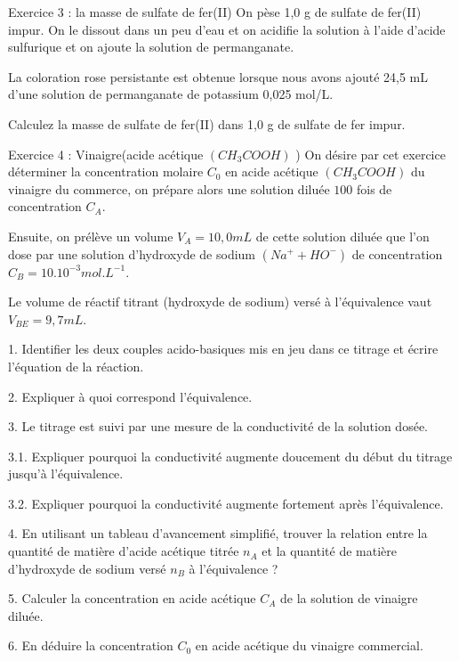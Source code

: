 \documentclass[12pt, french]{article}
\begin{document}
\begin{Box2}{Exercice 3 : la masse de sulfate de fer(II)}
On pèse 1,0 g de sulfate de fer(II) impur. On le dissout dans un peu d'eau et on acidifie la solution à l'aide
d'acide sulfurique et on ajoute la solution de permanganate. 

   La coloration rose persistante est obtenue
lorsque nous avons ajouté 24,5 mL d'une solution de permanganate de potassium 0,025 mol/L.

   Calculez la masse de sulfate de fer(II) dans 1,0 g de sulfate de fer impur.
\end{Box2}


\begin{Box2}{Exercice 4 :  Vinaigre(acide acétique $(CH_3COOH)$ ) }
On désire par cet exercice déterminer la concentration molaire $C_0$ en acide acétique $(CH_3COOH)$ du vinaigre du commerce, on prépare alors une solution diluée $100$ fois de concentration $C_A$.

Ensuite, on prélève un volume $V_A = 10,0 mL$ de cette solution diluée que l'on dose par une solution d'hydroxyde de
sodium $(Na^+ + HO^-)$ de concentration $C_B = 10.10^{-3} mol.L^{-1}$.

   Le volume de réactif titrant (hydroxyde de sodium) versé à l'équivalence vaut $V_{BE} = 9,7 mL.$

1. Identifier les deux couples acido-basiques mis en jeu dans ce titrage et écrire l'équation de la réaction.

2. Expliquer à quoi correspond l'équivalence.

3. Le titrage est suivi par une mesure de la conductivité de la solution dosée.

3.1. Expliquer pourquoi la conductivité augmente doucement du début du titrage jusqu'à l'équivalence.

3.2. Expliquer pourquoi la conductivité augmente fortement après l'équivalence.

   4. En utilisant un tableau d’avancement simplifié, trouver la relation entre la quantité de matière d'acide
acétique titrée $n_A$ et la quantité de matière d'hydroxyde de sodium versé $n_B$ à l'équivalence ?

5. Calculer la concentration en acide acétique $C_A$ de la solution de vinaigre diluée.

6. En déduire la concentration $C_0$ en acide acétique du vinaigre commercial.
\end{Box2}
\end{document}
